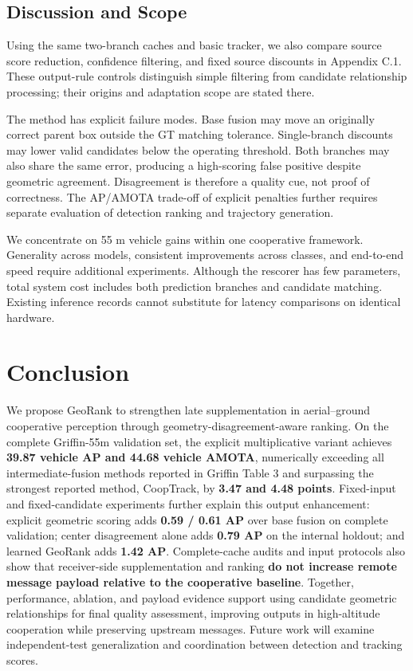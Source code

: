 \subsection{Discussion and Scope}

Using the same two-branch caches and basic tracker, we also compare source score reduction, confidence filtering, and fixed source discounts in Appendix C.1. These output-rule controls distinguish simple filtering from candidate relationship processing; their origins and adaptation scope are stated there.

The method has explicit failure modes. Base fusion may move an originally correct parent box outside the GT matching tolerance. Single-branch discounts may lower valid candidates below the operating threshold. Both branches may also share the same error, producing a high-scoring false positive despite geometric agreement. Disagreement is therefore a quality cue, not proof of correctness. The AP/AMOTA trade-off of explicit penalties further requires separate evaluation of detection ranking and trajectory generation.

We concentrate on 55 m vehicle gains within one cooperative framework. Generality across models, consistent improvements across classes, and end-to-end speed require additional experiments. Although the rescorer has few parameters, total system cost includes both prediction branches and candidate matching. Existing inference records cannot substitute for latency comparisons on identical hardware.

\section{Conclusion}

We propose GeoRank to strengthen late supplementation in aerial--ground cooperative perception through geometry-disagreement-aware ranking. On the complete Griffin-55m validation set, the explicit multiplicative variant achieves \textbf{39.87 vehicle AP and 44.68 vehicle AMOTA}, numerically exceeding all intermediate-fusion methods reported in Griffin Table 3 and surpassing the strongest reported method, CoopTrack, by \textbf{3.47 and 4.48 points}. Fixed-input and fixed-candidate experiments further explain this output enhancement: explicit geometric scoring adds \textbf{0.59 / 0.61 AP} over base fusion on complete validation; center disagreement alone adds \textbf{0.79 AP} on the internal holdout; and learned GeoRank adds \textbf{1.42 AP}. Complete-cache audits and input protocols also show that receiver-side supplementation and ranking \textbf{do not increase remote message payload relative to the cooperative baseline}. Together, performance, ablation, and payload evidence support using candidate geometric relationships for final quality assessment, improving outputs in high-altitude cooperation while preserving upstream messages. Future work will examine independent-test generalization and coordination between detection and tracking scores.

